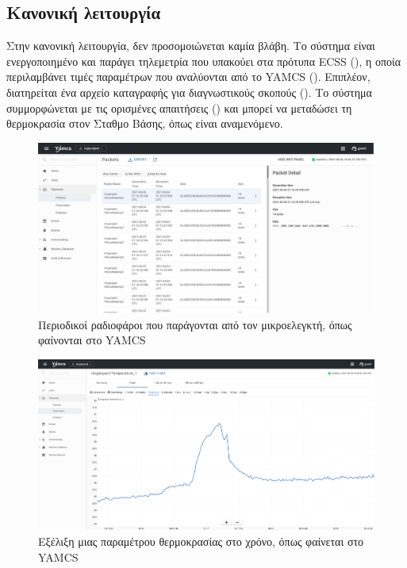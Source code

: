 \documentclass[a4paper,nobib]{tufte-book}
\begin{document}
\subsection{Κανονική λειτουργία}

Στην κανονική λειτουργία, δεν προσομοιώνεται καμία βλάβη. Το σύστημα είναι ενεργοποιημένο και παράγει τηλεμετρία που υπακούει στα πρότυπα \ac{ECSS} (), η οποία περιλαμβάνει τιμές παραμέτρων που αναλύονται από το \acs{YAMCS} (). Επιπλέον, διατηρείται ένα αρχείο καταγραφής για διαγνωστικούς σκοπούς (). Το σύστημα συμμορφώνεται με τις ορισμένες απαιτήσεις () και μπορεί να μεταδώσει τη θερμοκρασία στον Σταθμο Βάσης, όπως είναι αναμενόμενο.

\begin{figure}
	\centering
	\includegraphics{media/screenshots/yamcs_housekeeping}
	\caption{Περιοδικοί ραδιοφάροι που παράγονται από τον μικροελεγκτή, όπως φαίνονται στο \acs{YAMCS}}
	\label{fig:yamcshousekeeping}
\end{figure}

\begin{figure}[h]
	\centering
	\includegraphics{media/screenshots/yamcs_parameter}
	\caption{Εξέλιξη μιας παραμέτρου θερμοκρασίας στο χρόνο, όπως φαίνεται στο \acs{YAMCS}}
	\label{fig:yamcsparameter}
\end{figure}
\end{document}
